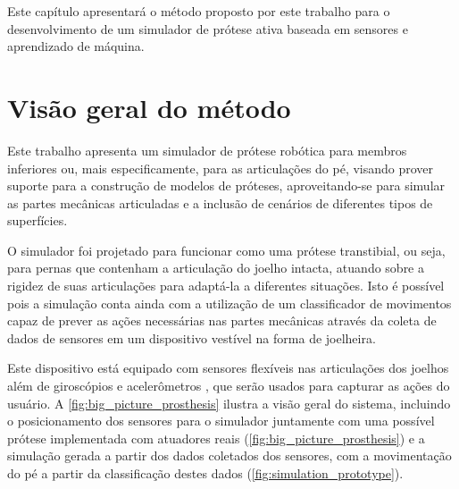 Este capítulo apresentará o método proposto por este trabalho para o desenvolvimento de um simulador de prótese ativa baseada em sensores e aprendizado de máquina.

\section{Visão geral do método}\label{sec:metodo_protese}

Este trabalho apresenta um simulador de prótese robótica para membros inferiores ou, mais especificamente, para as articulações do pé, visando prover suporte para a construção de modelos de próteses, aproveitando-se para simular as partes mecânicas articuladas e a inclusão de cenários de diferentes tipos de superfícies.

O simulador foi projetado para funcionar como uma prótese transtibial, ou seja, para pernas que contenham a articulação do joelho intacta, atuando sobre a rigidez de suas articulações para adaptá-la a diferentes situações. Isto é possível pois a simulação conta ainda com a utilização de um classificador de movimentos capaz de prever as ações necessárias nas partes mecânicas através da coleta de dados de sensores em um dispositivo vestível na forma de joelheira.

Este dispositivo está equipado com sensores flexíveis \cite{flex:datasheet} nas articulações dos joelhos além de giroscópios e acelerômetros \cite{invensense:imu_mpu}, que serão usados para capturar as ações do usuário. A \autoref{fig:big_picture_prosthesis} ilustra a visão geral do sistema, incluindo o posicionamento dos sensores para o simulador juntamente com uma possível prótese implementada com atuadores reais (\autoref{fig:big_picture_prosthesis}) e a simulação gerada a partir dos dados coletados dos sensores, com a movimentação do pé a partir da classificação destes dados (\autoref{fig:simulation_prototype}).


